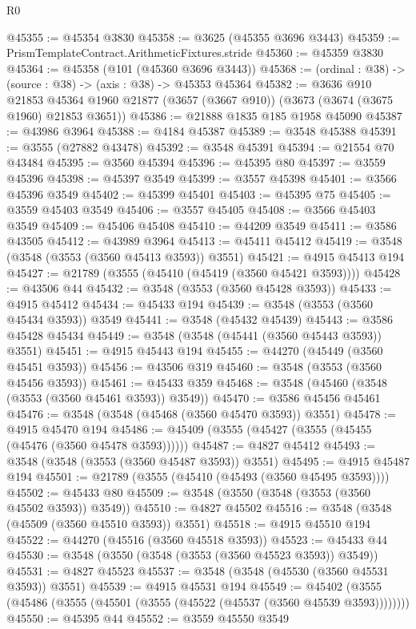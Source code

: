 \begin{lexlean}{R0}
\begin{coremodule}
@45355 := @45354 @3830
@45358 := @3625 (@45355 @3696 @3443)
@45359 := PrismTemplateContract.ArithmeticFixtures.stride
@45360 := @45359 @3830
@45364 := @45358 (@101 (@45360 @3696 @3443))
@45368 := (ordinal : @38) -> (source : @38) -> (axis : @38) -> @45353 @45364
@45382 := @3636
    @910
    @21853
    @45364
    @1960
    @21877
    (@3657 (@3667 @910))
    (@3673 (@3674 (@3675 @1960) @21853 @3651))
@45386 := @21888 @1835 @185 @1958 @45090
@45387 := @43986 @3964
@45388 := @4184 @45387
@45389 := @3548 @45388
@45391 := @3555 (@27882 @43478)
@45392 := @3548 @45391
@45394 := @21554 @70 @43484
@45395 := @3560 @45394
@45396 := @45395 @80
@45397 := @3559 @45396
@45398 := @45397 @3549
@45399 := @3557 @45398
@45401 := @3566 @45396 @3549
@45402 := @45399 @45401
@45403 := @45395 @75
@45405 := @3559 @45403 @3549
@45406 := @3557 @45405
@45408 := @3566 @45403 @3549
@45409 := @45406 @45408
@45410 := @44209 @3549
@45411 := @3586 @43505
@45412 := @43989 @3964
@45413 := @45411 @45412
@45419 := @3548 (@3548 (@3553 (@3560 @45413 @3593)) @3551)
@45421 := @4915 @45413 @194
@45427 := @21789 (@3555 (@45410 (@45419 (@3560 @45421 @3593))))
@45428 := @43506 @44
@45432 := @3548 (@3553 (@3560 @45428 @3593))
@45433 := @4915 @45412
@45434 := @45433 @194
@45439 := @3548 (@3553 (@3560 @45434 @3593)) @3549
@45441 := @3548 (@45432 @45439)
@45443 := @3586 @45428 @45434
@45449 := @3548 (@3548 (@45441 (@3560 @45443 @3593)) @3551)
@45451 := @4915 @45443 @194
@45455 := @44270 (@45449 (@3560 @45451 @3593))
@45456 := @43506 @319
@45460 := @3548 (@3553 (@3560 @45456 @3593))
@45461 := @45433 @359
@45468 := @3548 (@45460 (@3548 (@3553 (@3560 @45461 @3593)) @3549))
@45470 := @3586 @45456 @45461
@45476 := @3548 (@3548 (@45468 (@3560 @45470 @3593)) @3551)
@45478 := @4915 @45470 @194
@45486 := @45409 (@3555 (@45427 (@3555 (@45455 (@45476 (@3560 @45478 @3593))))))
@45487 := @4827 @45412
@45493 := @3548 (@3548 (@3553 (@3560 @45487 @3593)) @3551)
@45495 := @4915 @45487 @194
@45501 := @21789 (@3555 (@45410 (@45493 (@3560 @45495 @3593))))
@45502 := @45433 @80
@45509 := @3548 (@3550 (@3548 (@3553 (@3560 @45502 @3593)) @3549))
@45510 := @4827 @45502
@45516 := @3548 (@3548 (@45509 (@3560 @45510 @3593)) @3551)
@45518 := @4915 @45510 @194
@45522 := @44270 (@45516 (@3560 @45518 @3593))
@45523 := @45433 @44
@45530 := @3548 (@3550 (@3548 (@3553 (@3560 @45523 @3593)) @3549))
@45531 := @4827 @45523
@45537 := @3548 (@3548 (@45530 (@3560 @45531 @3593)) @3551)
@45539 := @4915 @45531 @194
@45549 := @45402 (@3555 (@45486 (@3555 (@45501 (@3555 (@45522 (@45537 (@3560 @45539 @3593))))))))
@45550 := @45395 @44
@45552 := @3559 @45550 @3549

\end{coremodule}
\end{lexlean}
